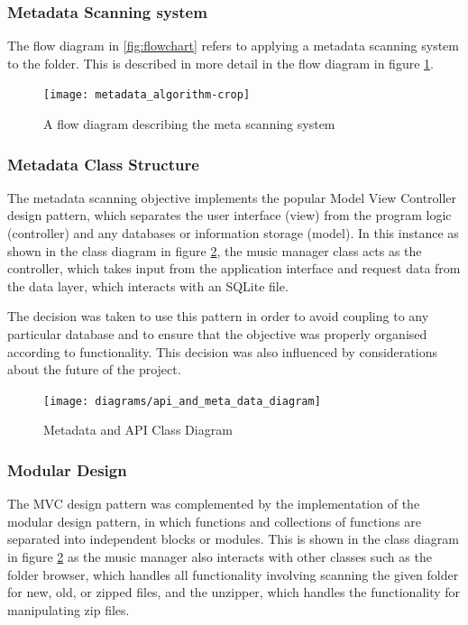 \subsubsection{Metadata Scanning system}
The flow diagram in \ref{fig:flowchart} refers to applying a metadata scanning system to the folder. This is described in more detail in the flow diagram in figure \ref{fig:meta}. 
\begin{figure}[H]
    \centering
    \texttt{[image: metadata\_algorithm-crop]}
    \caption{A flow diagram describing the meta scanning system}
    \label{fig:meta}
\end{figure}
\subsubsection{Metadata Class Structure}
The metadata scanning objective implements the popular Model View Controller design pattern, which separates the user interface (view) from the program logic (controller) and any databases or information storage (model). %
In this instance as shown in the class diagram in figure \ref{fig:metadiagram}, the music manager class acts as the controller, which takes input from the application interface and request data from the data layer, which interacts with an SQLite file.

The decision was taken to use this pattern in order to avoid coupling to any particular database and to ensure that the objective was properly organised according to functionality. This decision was also influenced by considerations about the future of the project.

\begin{figure}[H]
    \centering
    \texttt{[image: diagrams/api\_and\_meta\_data\_diagram]}
    \caption{Metadata and API Class Diagram}
    \label{fig:metadiagram}
\end{figure}

\subsubsection{Modular Design}
The MVC design pattern was complemented by the implementation of the  modular design pattern, in which functions and collections of functions are separated into independent blocks or modules. %
This is shown in the class diagram in figure \ref{fig:metadiagram} as the music manager also interacts with other classes such as the folder browser, which handles all functionality involving scanning the given folder for new, old, or zipped files, and the unzipper, which handles the functionality for manipulating zip files.

